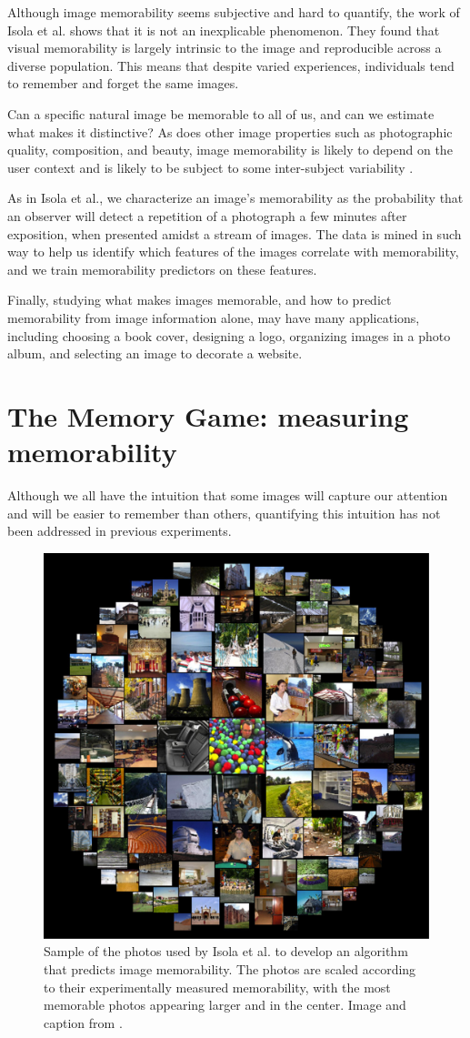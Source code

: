 \documentclass[10pt,twocolumn,letterpaper]{article}
\begin{document}
Although image memorability seems subjective and hard to quantify, the work of Isola et al. shows that it is not an inexplicable phenomenon. They found that visual memorability is largely intrinsic to the image and reproducible across a diverse population. This means that despite varied experiences, individuals tend to remember and forget the same images. 

Can a specific natural image be memorable to all of us, and can we estimate what makes it distinctive? As does other image properties such as photographic quality, composition, and beauty, image memorability is likely to depend on the user context and is likely to be subject to some inter-subject variability \cite{distinctiveness}. 

As in  Isola et al., we characterize an image's memorability as the probability that an observer will detect a repetition of a photograph a few minutes after exposition, when presented amidst a stream of images. The data is mined in such way to help us identify which features of the images correlate with memorability, and we train memorability predictors on these features.

Finally, studying what makes images memorable, and how to predict memorability from image information alone, may have many applications, including choosing a book cover, designing a logo, organizing images in a photo album, and selecting an image to decorate a website.

\section{The Memory Game: measuring memorability}
Although we all have the intuition that some images will capture our attention and will be easier to remember than others, quantifying this intuition has not been addressed in previous experiments.

\begin{figure}
    \centering
    \includegraphics[width=.7\linewidth]{figure/mem_importance.jpg}
    \caption{Sample of the photos used by Isola et al. to develop an algorithm that predicts image memorability. The photos are scaled according to their experimentally measured memorability, with the most memorable photos appearing larger and in the center. Image and caption from \cite{mem_post}.}
    \label{fig:mem_importance}
\end{figure}
\end{document}
